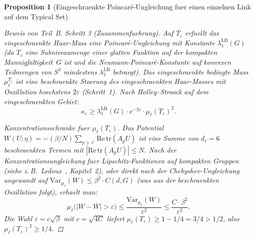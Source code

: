 \documentclass[12pt,a4paper]{article}
\theoremstyle{definition}
\theoremstyle{plain}
\newtheorem{proposition}[definition]{Proposition}
\theoremstyle{remark}
\begin{document}
\begin{proposition}[Eingeschraenkte Poincar\'e-Ungleichung fuer einen einzelnen Link auf dem Typical Set]
\begin{proof}[Beweis von Teil~B]
\emph{Schritt 3 (Zusammenfuehrung).}
Auf $T_\varepsilon$ erfuellt das eingeschraenkte Haar-Mass eine Poincar\'e-Ungleichung mit Konstante $\lambda_1^{\mathrm{LB}}(G)$ (da $T_\varepsilon$ eine Subniveaumenge einer glatten Funktion auf der kompakten Mannigfaltigkeit~$G$ ist und die Neumann-Poincar\'e-Konstante auf konvexen Teilmengen von $S^3$ mindestens $\lambda_1^{\mathrm{LB}}$ betraegt). Das eingeschraenkte bedingte Mass $\mu_\ell^{T_\varepsilon}$ ist eine beschraenkte Stoerung des eingeschraenkten Haar-Masses mit Oszillation hoechstens $2\varepsilon$ (Schritt~1). Nach Holley--Stroock auf dem eingeschraenkten Gebiet:
\[
    \kappa_\varepsilon \geq \lambda_1^{\mathrm{LB}}(G) \cdot e^{-2\varepsilon} \cdot \mu_\ell(T_\varepsilon)^2.
\]

\emph{Konzentrationsschranke fuer $\mu_\ell(T_\varepsilon)$.}
Das Potential $W(U;\eta) = -(\beta/N)\sum_{p \ni \ell} \mathrm{Re}\,\mathrm{tr}(A_p U)$ ist eine Summe von $d_\ell = 6$ beschraenkten Termen mit $|\mathrm{Re}\,\mathrm{tr}(A_p U)| \leq N$. Nach der Konzentrations\-ungleichung fuer Lipschitz-Funktionen auf kompakten Gruppen (siehe z.\,B.\ Ledoux~\cite{Ledoux2001}, Kapitel~2), oder direkt nach der Chebyshev-Ungleichung angewandt auf $\mathrm{Var}_{\mu_\ell}(W) \leq \beta^2 \cdot C(d,G)$ (was aus der beschraenkten Oszillation folgt), erhaelt man:
\[
    \mu_\ell\bigl(\bigl|W - \overline{W}\bigr| > \varepsilon\bigr) \leq \frac{\mathrm{Var}_{\mu_\ell}(W)}{\varepsilon^2} \leq \frac{C \cdot \beta^2}{\varepsilon^2}.
\]
Die Wahl $\varepsilon = c\sqrt{\beta}$ mit $c = \sqrt{4C}$ liefert $\mu_\ell(T_\varepsilon) \geq 1 - 1/4 = 3/4 > 1/2$, also $\mu_\ell(T_\varepsilon)^2 \geq 1/4$.
\end{proof}
\end{proposition}
\end{document}
